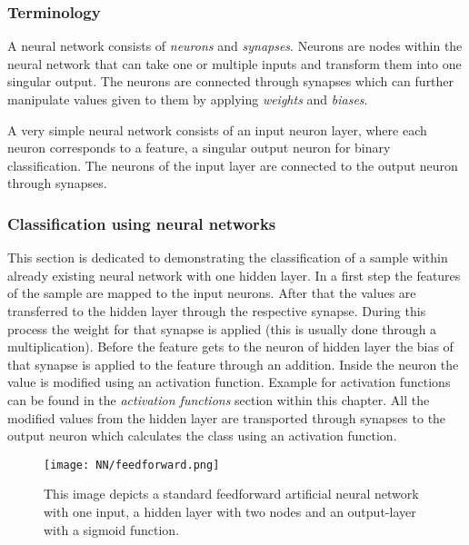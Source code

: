 \subsubsection*{Terminology}
A neural network consists of \textit{neurons} and \textit{synapses}. 
Neurons are nodes within the neural network that can take one or multiple inputs and transform them into one singular output.
The neurons are connected through synapses which can further manipulate values given to them by applying \textit{weights} and \textit{biases}\cite[]{Schmidhuber2015}.

A very simple neural network consists of an input neuron layer, where each neuron corresponds to a feature, a singular output neuron for binary classification. 
The neurons of the input layer are connected to the output neuron through synapses.

\subsubsection*{Classification using neural networks}
This section is dedicated to demonstrating the classification of a sample within already existing neural network with one hidden layer.
In a first step the features of the sample are mapped to the input neurons. After that the values are transferred to the hidden layer through the respective 
synapse. During this process the weight for that synapse is applied (this is usually done through a multiplication). Before the feature gets to the neuron of hidden layer 
the bias of that synapse is applied to the feature through an addition. Inside the neuron the value is modified using an activation function. Example for activation functions can be found 
in the \textit{activation functions} section within this chapter. All the modified values from the hidden layer are transported through synapses to the output neuron 
which calculates the class using an activation function\cite[]{Schmidhuber2015}.
\begin{figure}[H]
    \begin{center}
        \captionsetup{justification=centering}
        \caption[]{
        This image depicts a standard feedforward artificial neural network with one input, a hidden layer with two nodes and an output-layer 
        with a sigmoid function.}
        \label{fig:nn_rep}
        \texttt{[image: NN/feedforward.png]}
    \end{center}
\end{figure}

